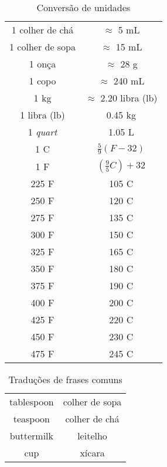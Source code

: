 \begin{table}[h]
	\centering
	\begin{tabular}[h]{c c}
		\hline
		1 colher de chá  & $\approx$ 5 mL                    \\
		1 colher de sopa & $\approx$ 15 mL                   \\
		1 onça           & $\approx$ 28 g                    \\
		1 copo           & $\approx$ 240 mL                  \\
		1 kg             & $\approx$ 2.20 libra (lb)         \\
		1 libra (lb)     & 0.45 kg                           \\
		1 \emph{quart}   & 1.05 L                            \\
		\hline
		1 \grau C        & $\frac{5}{9} \left( F-32 \right)$ \\
		1 \grau F        & $\left(\frac{9}{5} C\right)+32$   \\
		\hline
		225 \grau F      & 105 \grau C                       \\
		250 \grau F      & 120 \grau C                       \\
		275 \grau F      & 135 \grau C                       \\
		300 \grau F      & 150 \grau C                       \\
		325 \grau F      & 165 \grau C                       \\
		350 \grau F      & 180 \grau C                       \\
		375 \grau F      & 190 \grau C                       \\
		400 \grau F      & 200 \grau C                       \\
		425 \grau F      & 220 \grau C                       \\
		450 \grau F      & 230 \grau C                       \\
		475 \grau F      & 245 \grau C                       \\
		\hline
	\end{tabular}
	\caption{Conversão de unidades}
	\label{tab:conversao_unidades}
\end{table}

\begin{table}[h]
	\centering
	\begin{tabular}[h]{c c}
		\hline
		tablespoon & colher de sopa \\
		teaspoon   & colher de chá  \\
		buttermilk & leitelho       \\
		cup        & xícara         \\
    \hline
	\end{tabular}
	\caption{Traduções de frases comuns}
	\label{tab:traducoes_comuns}
\end{table}
\clearpage
